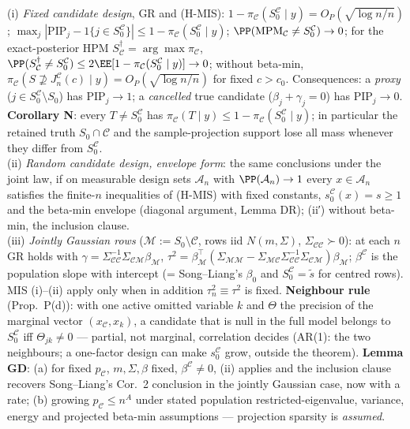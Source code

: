 \begin{theorem}[MIS]\label{reg:C-MIS_Thm-MIS_i_}
(i) \emph{Fixed candidate design}, GR and (H-MIS): $1-\pi_{\mathcal C}(S_0^{\mathcal C}\mid y)=O_P(\sqrt{\log n/n})$; $\max_j|\mathrm{PIP}_j-1\{j\in S_0^{\mathcal C}\}|\le1-\pi_{\mathcal C}(S_0^{\mathcal C}\mid y)$; $\PP(\mathrm{MPM}_{\mathcal C}\ne S_0^{\mathcal C})\to0$; for the exact-posterior HPM $S^\dagger_{\mathcal C}=\arg\max\pi_{\mathcal C}$, $\PP(S^\dagger_{\mathcal C}\ne S_0^{\mathcal C})\le2\EE[1-\pi_{\mathcal C}(S_0^{\mathcal C}\mid y)]\to0$; without beta-min, $\pi_{\mathcal C}(S\not\supseteq J_n^{\mathcal C}(c)\mid y)=O_P(\sqrt{\log n/n})$ for fixed $c>c_0$. Consequences: a \emph{proxy} ($j\in S_0^{\mathcal C}\setminus S_0$) has $\mathrm{PIP}_j\to1$; a \emph{cancelled} true candidate ($\beta_j+\gamma_j=0$) has $\mathrm{PIP}_j\to0$. \textbf{Corollary N}: every $T\ne S_0^{\mathcal C}$ has $\pi_{\mathcal C}(T\mid y)\le1-\pi_{\mathcal C}(S_0^{\mathcal C}\mid y)$; in particular the retained truth $S_0\cap\mathcal C$ and the sample-projection support lose all mass whenever they differ from $S_0^{\mathcal C}$.\\
(ii) \emph{Random candidate design, envelope form}: the same conclusions under the joint law, if on measurable design sets $\mathcal A_n$ with $\PP(\mathcal A_n)\to1$ every $x\in\mathcal A_n$ satisfies the finite-$n$ inequalities of (H-MIS) with fixed constants, $s_0^{\mathcal C}(x)=s\ge1$ and the beta-min envelope (diagonal argument, Lemma DR); (ii′) without beta-min, the inclusion clause.\\
(iii) \emph{Jointly Gaussian rows} ($\mathcal M:=S_0\setminus\mathcal C$, rows iid $N(m,\Sigma)$, $\Sigma_{\mathcal C\mathcal C}\succ0$): at each $n$ GR holds with $\gamma=\Sigma_{\mathcal C\mathcal C}^{-1}\Sigma_{\mathcal C\mathcal M}\beta_{\mathcal M}$, $\tau^2=\beta_{\mathcal M}^\top(\Sigma_{\mathcal M\mathcal M}-\Sigma_{\mathcal M\mathcal C}\Sigma_{\mathcal C\mathcal C}^{-1}\Sigma_{\mathcal C\mathcal M})\beta_{\mathcal M}$; $\beta^{\mathcal C}$ is the population slope with intercept (= Song--Liang's $\beta_0$ and $S_0^{\mathcal C}=\tilde{s}$ for centred rows). MIS (i)--(ii) apply only when in addition $\tau_n^2\equiv\tau^2$ is fixed. \textbf{Neighbour rule} (Prop.~P(d)): with one active omitted variable $k$ and $\Theta$ the precision of the marginal vector $(x_{\mathcal C},x_k)$, a candidate that is null in the full model belongs to $S_0^{\mathcal C}$ iff $\Theta_{jk}\ne0$ — partial, not marginal, correlation decides (AR(1): the two neighbours; a one-factor design can make $s_0^{\mathcal C}$ grow, outside the theorem). \textbf{Lemma GD}: (a) for fixed $p_{\mathcal C}$, $m,\Sigma,\beta$ fixed, $\beta^{\mathcal C}\ne0$, (ii) applies and the inclusion clause recovers Song--Liang's Cor.~2 conclusion in the jointly Gaussian case, now with a rate; (b) growing $p_{\mathcal C}\le n^A$ under stated population restricted-eigenvalue, variance, energy and projected beta-min assumptions — projection sparsity is \emph{assumed}.
\end{theorem}

